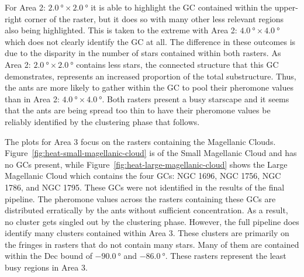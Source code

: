 For Area 2: $\SI{2.0}{\degree}\times\SI{2.0}{\degree}$ it is able to highlight the GC
contained within the upper-right corner of the raster, but it does so with many
other less relevant regions also being highlighted. This is taken to the extreme
with Area 2: $\SI{4.0}{\degree}\times\SI{4.0}{\degree}$ which does not clearly
identify the GC at all. The difference in these outcomes is due to the disparity
in the number of stars contained within both rasters. As Area 2:
$\SI{2.0}{\degree}\times\SI{2.0}{\degree}$ contains less stars, the connected
structure that this GC demonstrates, represents an increased proportion of the
total substructure. Thus, the ants are more likely to gather within the GC to
pool their pheromone values than in Area 2:
$\SI{4.0}{\degree}\times\SI{4.0}{\degree}$. Both rasters present a busy starscape and
it seems that the ants are being spread too thin to have their pheromone values
be reliably identified by the clustering phase that follows.

The plots for Area 3 focus on the rasters containing the Magellanic Clouds.
Figure~\ref{fig:heat-small-magellanic-cloud} is of the Small Magellanic Cloud
and has no GCs present, while Figure~\ref{fig:heat-large-magellanic-cloud} shows
the Large Magellanic Cloud which contains the four GCs: NGC 1696, NGC 1756, NGC
1786, and NGC 1795. These GCs were not identified in the results of the final
pipeline. The pheromone values across the rasters containing these GCs are
distributed erratically by the ants without sufficient concentration. As a
result, no cluster gets singled out by the clustering phase. However, the full
pipeline does identify many clusters contained within Area 3. These clusters are
primarily on the fringes in rasters that do not contain many stars. Many of them
are contained within the Dec bound of $\SI{-90.0}{\degree}$ and
$\SI{-86.0}{\degree}$. These rasters represent the least busy regions in Area 3.

